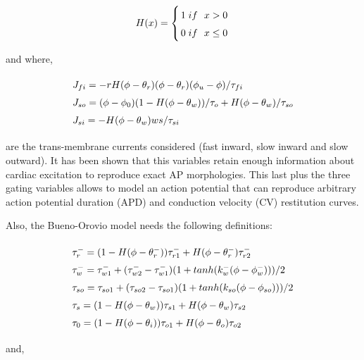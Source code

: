 \begin{equation}
\arraycolsep=1.4pt\def\arraystretch{1.5}
H(x) = 
\left\lbrace
\begin{array}{lr}
1 & if~~x > 0 \\
0 & if~~x \leq 0
\end{array} 
\right. \label{eq:HS}
\end{equation}

and where,

\begin{equation}
\arraycolsep=1.4pt\def\arraystretch{1.5}
\begin{array}{lr}
J_{fi} = -r H(\phi - \theta_r)(\phi - \theta_r)(\phi_u - \phi)/ \tau_{fi} \\
J_{so} = (\phi - \phi_0)(1 - H(\phi - \theta_w))/\tau_o + H(\phi - \theta_w)/\tau_{so} \\
J_{si} = -H(\phi - \theta_w)ws/\tau_{si} 
\end{array} \label{eq:mde_currents}
\end{equation}

are the trans-membrane currents considered (fast inward, slow inward and slow outward). It has been shown that this variables retain enough information about cardiac excitation to reproduce exact AP morphologies. This last plus the three gating variables allows to model an action potential that can reproduce arbitrary action potential duration (APD) and conduction velocity (CV) restitution curves.

Also, the Bueno-Orovio model needs the following definitions:

\begin{equation}
\arraycolsep=1.4pt\def\arraystretch{1.5}
\begin{array}{lr}
\tau_r^- = (1 - H(\phi - \theta_r^-))\tau_{r1}^- + H(\phi - \theta_r^-)\tau_{r2}^- \\
\tau_w^- = \tau_{w1}^- + (\tau_{w2}^- - \tau_{w1}^-)(1 + tanh(k_w^- (\phi- \phi_w^-)))/2 \\
\tau_{so} = \tau_{so1} + (\tau_{so2} - \tau_{so1})(1 + tanh(k_{so}(\phi - \phi_{so})))/2 \\
\tau_s = (1 - H(\phi - \theta_w))\tau_{s1} + H(\phi - \theta_w)\tau_{s2} \\
\tau_0 = (1 - H(\phi - \theta_i)) \tau_{o1} + H(\phi - \theta_o) \tau_{o2} \\
\end{array} \label{eq:mde_parameters}
\end{equation}

and,

